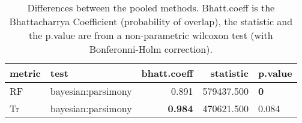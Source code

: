 \begin{table}[ht]
\centering
\begin{tabular}{llr|rl}
  \hline
metric & test & bhatt.coeff & statistic & p.value \\ 
  \hline
RF & bayesian:parsimony & 0.891 & 579437.500 & \textbf{0} \\ 
  Tr & bayesian:parsimony & \textbf{0.984} & 470621.500 & 0.084 \\ 
   \hline
\end{tabular}
\caption{Differences between the pooled methods. Bhatt.coeff is the Bhattacharrya Coefficient (probability of overlap), the statistic and the p.value are from a non-parametric wilcoxon test (with Bonferonni-Holm correction).} 
\label{Tab_pooledsmethods_test}
\end{table}
